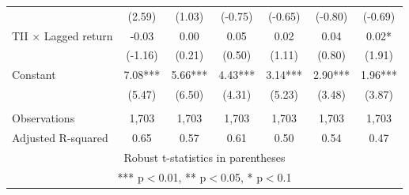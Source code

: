 \documentclass[]{article}
\begin{document}
\begin{tabular}{lcccccc}
 & (2.59) & (1.03) & (-0.75) & (-0.65) & (-0.80) & (-0.69) \\
TII $\times$ Lagged return & -0.03 & 0.00 & 0.05 & 0.02 & 0.04 & 0.02* \\
 & (-1.16) & (0.21) & (0.50) & (1.11) & (0.80) & (1.91) \\
Constant & 7.08*** & 5.66*** & 4.43*** & 3.14*** & 2.90*** & 1.96*** \\
 & (5.47) & (6.50) & (4.31) & (5.23) & (3.48) & (3.87) \\
 &  &  &  &  &  &  \\
Observations & 1,703 & 1,703 & 1,703 & 1,703 & 1,703 & 1,703 \\
 Adjusted R-squared & 0.65 & 0.57 & 0.61 & 0.50 & 0.54 & 0.47 \\ \hline
\multicolumn{7}{c}{ Robust t-statistics in parentheses} \\
\multicolumn{7}{c}{ *** p$<$0.01, ** p$<$0.05, * p$<$0.1} \\
\end{tabular}
\end{document}
